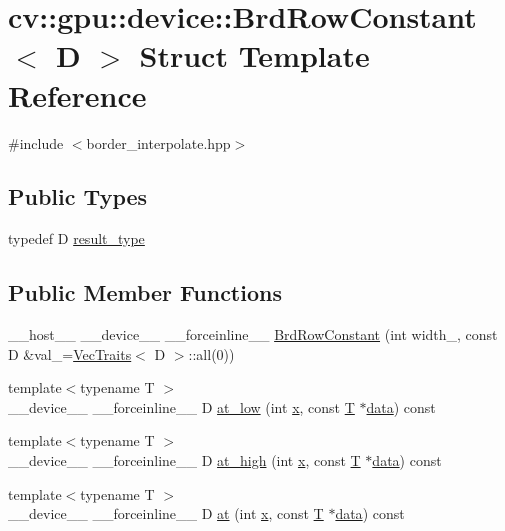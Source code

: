 \hypertarget{structcv_1_1gpu_1_1device_1_1BrdRowConstant}{\section{cv\-:\-:gpu\-:\-:device\-:\-:Brd\-Row\-Constant$<$ D $>$ Struct Template Reference}
\label{structcv_1_1gpu_1_1device_1_1BrdRowConstant}
}


{\ttfamily \#include $<$border\-\_\-interpolate.\-hpp$>$}

\subsection*{Public Types}
\begin{DoxyCompactItemize}
\item 
typedef D \hyperlink{structcv_1_1gpu_1_1device_1_1BrdRowConstant_ad069e8fde31651932df9981f98fdb1c4}{result\-\_\-type}
\end{DoxyCompactItemize}
\subsection*{Public Member Functions}
\begin{DoxyCompactItemize}
\item 
\-\_\-\-\_\-host\-\_\-\-\_\- \-\_\-\-\_\-device\-\_\-\-\_\- \-\_\-\-\_\-forceinline\-\_\-\-\_\- \hyperlink{structcv_1_1gpu_1_1device_1_1BrdRowConstant_ad984a9e64a952f35da76de452b92a4e0}{Brd\-Row\-Constant} (int width\-\_\-, const D \&val\-\_\-=\hyperlink{structcv_1_1gpu_1_1device_1_1VecTraits}{Vec\-Traits}$<$ D $>$\-::all(0))
\item 
{\footnotesize template$<$typename T $>$ }\\\-\_\-\-\_\-device\-\_\-\-\_\- \-\_\-\-\_\-forceinline\-\_\-\-\_\- D \hyperlink{structcv_1_1gpu_1_1device_1_1BrdRowConstant_a6d7d3c5a48e90c2899b5946084ce2386}{at\-\_\-low} (int \hyperlink{highgui__c_8h_a6150e0515f7202e2fb518f7206ed97dc}{x}, const \hyperlink{calib3d_8hpp_a3efb9551a871ddd0463079a808916717}{T} $\ast$\hyperlink{legacy_8hpp_ab9fe6c09e6d02865a953fffc12fe6ca0}{data}) const 
\item 
{\footnotesize template$<$typename T $>$ }\\\-\_\-\-\_\-device\-\_\-\-\_\- \-\_\-\-\_\-forceinline\-\_\-\-\_\- D \hyperlink{structcv_1_1gpu_1_1device_1_1BrdRowConstant_ad387a8aa022bcf70c637ce3de6e2dbf1}{at\-\_\-high} (int \hyperlink{highgui__c_8h_a6150e0515f7202e2fb518f7206ed97dc}{x}, const \hyperlink{calib3d_8hpp_a3efb9551a871ddd0463079a808916717}{T} $\ast$\hyperlink{legacy_8hpp_ab9fe6c09e6d02865a953fffc12fe6ca0}{data}) const 
\item 
{\footnotesize template$<$typename T $>$ }\\\-\_\-\-\_\-device\-\_\-\-\_\- \-\_\-\-\_\-forceinline\-\_\-\-\_\- D \hyperlink{structcv_1_1gpu_1_1device_1_1BrdRowConstant_aac2820325eb07e5036944cad279e001e}{at} (int \hyperlink{highgui__c_8h_a6150e0515f7202e2fb518f7206ed97dc}{x}, const \hyperlink{calib3d_8hpp_a3efb9551a871ddd0463079a808916717}{T} $\ast$\hyperlink{legacy_8hpp_ab9fe6c09e6d02865a953fffc12fe6ca0}{data}) const 
\end{DoxyCompactItemize}
